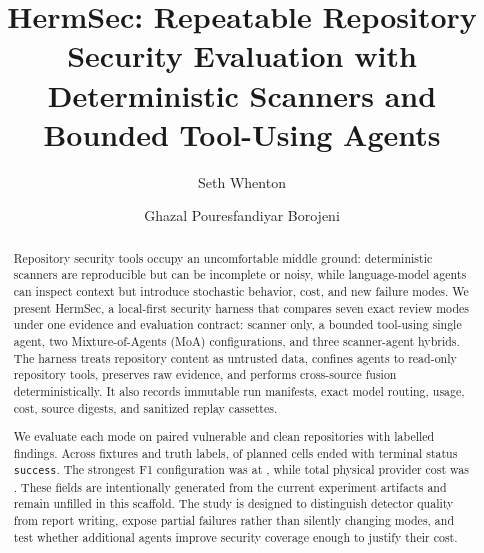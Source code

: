 \documentclass[sigconf,nonacm]{acmart}
\newcommand{\findingstate}[1]{\texttt{#1}}
\begin{document}
\title{HermSec: Repeatable Repository Security Evaluation with Deterministic Scanners and Bounded Tool-Using Agents}

\author{Seth Whenton}
\email{}

\author{Ghazal Pouresfandiyar Borojeni}
\email{}

\begin{abstract}
Repository security tools occupy an uncomfortable middle ground: deterministic scanners are reproducible but can be incomplete or noisy, while language-model agents can inspect context but introduce stochastic behavior, cost, and new failure modes. We present HermSec, a local-first security harness that compares seven exact review modes under one evidence and evaluation contract: scanner only, a bounded tool-using single agent, two Mixture-of-Agents (MoA) configurations, and three scanner-agent hybrids. The harness treats repository content as untrusted data, confines agents to read-only repository tools, preserves raw evidence, and performs cross-source fusion deterministically. It also records immutable run manifests, exact model routing, usage, cost, source digests, and sanitized replay cassettes.

We evaluate each mode on paired vulnerable and clean repositories with labelled findings. Across \DatasetFixtureCount{} fixtures and \DatasetTruthCount{} truth labels, \CompletedCellCount{} of \ExpectedCellCount{} planned cells ended with terminal status \findingstate{success}. The strongest F1 configuration was \BestFOneMode{} at \BestFOneValue{}, while total physical provider cost was \TotalPhysicalCost{}. These fields are intentionally generated from the current experiment artifacts and remain unfilled in this scaffold. The study is designed to distinguish detector quality from report writing, expose partial failures rather than silently changing modes, and test whether additional agents improve security coverage enough to justify their cost.
\end{abstract}


\maketitle
\end{document}
